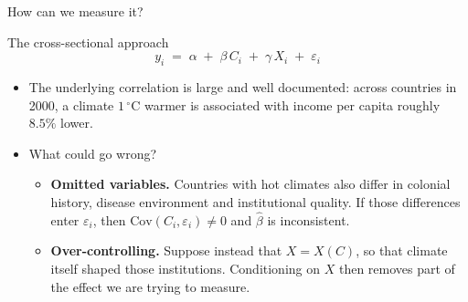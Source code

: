 \documentclass[aspectratio=169,10pt]{beamer}
\newcommand{\dtag}[2]{{\ttfamily\scriptsize\color{#1}#2}}
\begin{document}
\begin{frame}{How can we measure it?}
\begin{center}
  \end{center}
  \vspace{-2pt}
\end{frame}

\begin{frame}{The cross-sectional approach}
  \[
    y_i \;=\; \alpha \;+\; \beta\, C_i \;+\; \gamma\, X_i \;+\; \varepsilon_i
  \]
  \begin{itemize}
    \item The underlying correlation is large and well documented: across countries
          in 2000, a climate $1\,^\circ$C warmer is associated with income per capita
          roughly $8.5\%$ lower.
    \item What could go wrong?
      \begin{itemize}
        \item \textbf{Omitted variables.} Countries with hot climates also differ in
              colonial history, disease environment and institutional quality. If
              those differences enter $\varepsilon_i$, then
              $\mathrm{Cov}(C_i, \varepsilon_i) \neq 0$ and $\hat\beta$ is
              inconsistent.
        \item \textbf{Over-controlling.} Suppose instead that $X = X(C)$, so that
              climate itself shaped those institutions. Conditioning on $X$ then
              removes part of the effect we are trying to measure.
      \end{itemize}
  \end{itemize}
\end{frame}
\end{document}
